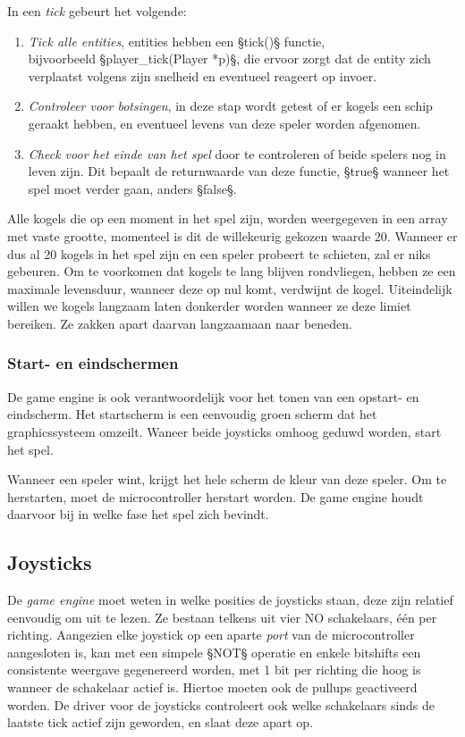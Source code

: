 \documentclass[12pt]{ugentreport}
\begin{document}
In een \emph{tick} gebeurt het volgende:
\begin{enumerate}
\item \emph{Tick alle entities}, entities hebben een §tick()§ functie,\\
  bijvoorbeeld §player_tick(Player *p)§, die ervoor zorgt dat de entity zich
  verplaatst volgens zijn snelheid en eventueel reageert op invoer.

\item \emph{Controleer voor botsingen}, in deze stap wordt getest of er
  kogels een schip geraakt hebben, en eventueel levens van deze speler worden
  afgenomen.

\item \emph{Check voor het einde van het spel} door te controleren of beide
  spelers nog in leven zijn. Dit bepaalt de returnwaarde van deze functie,
  §true§ wanneer het spel moet verder gaan, anders §false§.
\end{enumerate}

Alle kogels die op een moment in het spel zijn, worden weergegeven in een array
met vaste grootte, momenteel is dit de willekeurig gekozen waarde 20. Wanneer
er dus al 20 kogels in het spel zijn en een speler probeert te schieten, zal er
niks gebeuren. Om te voorkomen
dat kogels te lang blijven rondvliegen, hebben ze een maximale levensduur,
wanneer deze op nul komt, verdwijnt de kogel. Uiteindelijk willen we kogels
langzaam laten donkerder worden wanneer ze deze limiet bereiken. Ze zakken apart
daarvan langzaamaan naar beneden.

\subsubsection{Start- en eindschermen}
De game engine is ook verantwoordelijk voor het tonen van een opstart- en
eindscherm. Het startscherm is een eenvoudig groen scherm dat het
graphicssysteem omzeilt. Waneer beide joysticks omhoog geduwd worden, start het
spel.

Wanneer een speler wint, krijgt het hele scherm de kleur van deze speler. Om te
herstarten, moet de microcontroller herstart worden. De game engine houdt
daarvoor bij in welke fase het spel zich bevindt.

\subsection{Joysticks}
De \emph{game engine} moet weten in welke posities de joysticks staan,
deze zijn relatief eenvoudig om uit te lezen.
Ze bestaan telkens uit vier NO schakelaars, één per richting.
Aangezien elke joystick op een aparte \emph{port} van de microcontroller
aangesloten is, kan met een simpele §NOT§ operatie en enkele bitshifts een
consistente weergave gegenereerd worden, met 1 bit per richting die hoog is
wanneer de schakelaar actief is. Hiertoe moeten ook de pullups geactiveerd
worden. De driver voor de joysticks controleert ook welke schakelaars sinds de
laatste tick actief zijn geworden, en slaat deze apart op.
\end{document}

